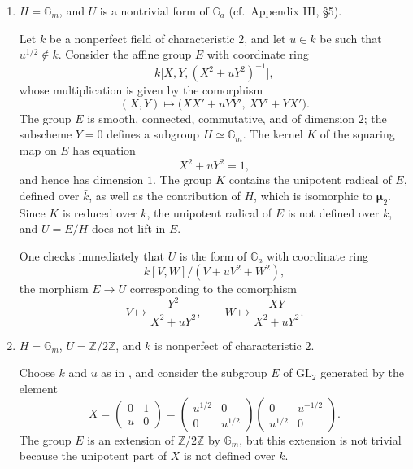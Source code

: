 \begin{enumerate}
\item[(a)] 
  \(H=\mathbb G_m\), and \(U\) is a nontrivial form of
  \(\mathbb G_a\) (cf.\ Appendix III, \S5).

  Let \(k\) be a nonperfect field of characteristic \(2\), and
  let \(u\in k\) be such that \(u^{1/2}\notin k\).  Consider the
  affine group \(E\) with coordinate ring
  \[
    k\bigl[X,Y,(X^2+uY^2)^{-1}\bigr],
  \]
  whose multiplication is given by the comorphism
  \[
    (X,Y)\longmapsto
      \bigl(XX'+uYY',\,XY'+YX'\bigr).
  \]
  The group \(E\) is smooth, connected, commutative, and of
  dimension \(2\); the subscheme \(Y=0\) defines a subgroup
  \(H\simeq\mathbb G_m\).  The kernel \(K\) of the squaring map
  on \(E\) has equation
  \[
    X^2+uY^2=1,
  \]
  and hence has dimension \(1\).  The group \(K\) contains the
  unipotent radical of \(E\), defined over \(\bar k\), as well as
  the contribution of \(H\), which is isomorphic to
  \(\boldsymbol\mu_2\).  Since \(K\) is reduced over \(k\),
  the unipotent radical of \(E\) is not defined over \(k\), and
  \(U=E/H\) does not lift in \(E\).

  One checks immediately that \(U\) is the form of
  \(\mathbb G_a\) with coordinate ring
  \[
    k[V,W]/(V+uV^2+W^2),
  \]
  the morphism \(E\longrightarrow U\) corresponding to the
  comorphism
  \[
    V\longmapsto\frac{Y^2}{X^2+uY^2},
    \qquad
    W\longmapsto\frac{XY}{X^2+uY^2}.
  \]

\item[(b)] 
  \(H=\mathbb G_m\), \(U=\mathbb Z/2\mathbb Z\), and \(k\) is
  nonperfect of characteristic \(2\).

  Choose \(k\) and \(u\) as in , and consider the subgroup
  \(E\) of \(\mathrm{GL}_2\) generated by the element
  \[
    X=
    \begin{pmatrix}0&1\\u&0\end{pmatrix}
    =
    \begin{pmatrix}u^{1/2}&0\\0&u^{1/2}\end{pmatrix}
    \begin{pmatrix}0&u^{-1/2}\\u^{1/2}&0\end{pmatrix}.
  \]
  The group \(E\) is an extension of \(\mathbb Z/2\mathbb Z\)
  by \(\mathbb G_m\), but this extension is not trivial because
  the unipotent part of \(X\) is not defined over \(k\).


\end{enumerate}
